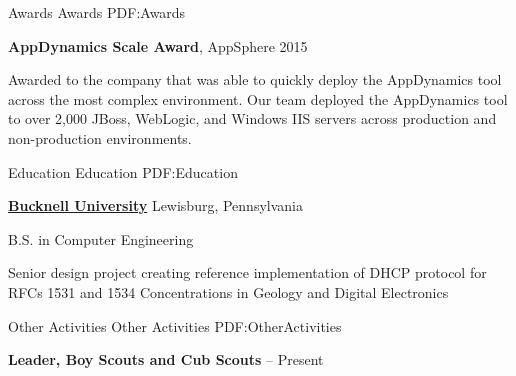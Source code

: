\documentclass[letterpaper,MMMMyyyy,nonstopmode]{simpleresumecv}
\begin{document}
\begin{Body}
\Section
{Awards}
{Awards}
{PDF:Awards}

\textbf{AppDynamics Scale Award}, AppSphere 2015
\hfill
{}
\begin{Detail}
Awarded to the company that was able to quickly deploy the AppDynamics tool across the most complex environment. Our team deployed the AppDynamics tool to over 2,000 JBoss, WebLogic, and Windows IIS servers across production and non-production environments.
\end{Detail}


\iffalse
\Section
{Publications}
{Publications}
{PDF:Publications}

\SubSection
{Technical Editor}
{Technical Editor}
{PDF:TechnicalEditor}

\Entry
\href{https://www.amazon.com/Oracle-Certified-Associate-ProgrammerStudy/dp/1849687323}
{Reece, Richard M. \textit{Oracle Certified Associate, Java SE 7 Programmer Study Guide}, Packt Publishing, 2012}

\Gap
\Entry
\href
{https://www.amazon.com/Java-Concurrency-Cookbook-FernandezJavier/dp/1849687889}
{Gonzalez, Javier Fernandez. \textit{Java 7 Concurrency Cookbook}, Packt Publishing, 2012}
\fi


\Section
{Education}
{Education}
{PDF:Education}

\Entry
\href{http://www.bucknell.edu/}
{\textbf{Bucknell University}}
\hfill Lewisburg, Pennsylvania

B.S. in Computer Engineering
\iffalse
\hfill
\DatestampYM{1988}{09} --
\DatestampYM{1992}{06}
\fi
\begin{Detail}
\BulletItem
Senior design project creating reference implementation of DHCP protocol for RFCs 1531 and 1534
\BulletItem
Concentrations in Geology and Digital Electronics

\end{Detail}

\Section
{Other Activities}
{Other Activities}
{PDF:OtherActivities}

\Entry
\textbf{Leader, Boy Scouts and Cub Scouts}
\hfill
{} -- Present


\end{Body}
\end{document}
